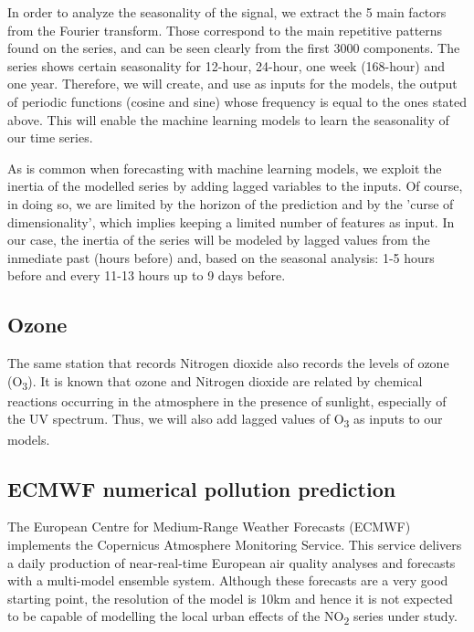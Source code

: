 \documentclass[a4paper,3p,sort&compress]{elsarticle}
\begin{document}
In order to analyze the seasonality of the signal, we extract the 5
main factors from the Fourier transform. Those correspond to the main
repetitive patterns found on the series, and can be seen clearly from
the first 3000 components. The series shows certain seasonality for
12-hour, 24-hour, one week (168-hour) and one year.  Therefore, we will
create, and use as inputs for the models, the output of periodic
functions (cosine and sine) whose frequency is equal to the ones
stated above. This will enable the machine learning models to learn
the seasonality of our time series.

As is common when forecasting with machine learning models, we exploit
the inertia of the modelled series by adding lagged variables to the
inputs. Of course, in doing so, we are limited by the horizon of the
prediction and by the 'curse of dimensionality', which implies keeping
a limited number of features as input. In our case, the inertia of the
series will be modeled by lagged values from the inmediate past (hours
before) and, based on the seasonal analysis: 1-5 hours before and
every 11-13 hours up to 9 days before.

\subsection{Ozone}


The same station that records Nitrogen dioxide also records the levels
of ozone (O\textsubscript{3}). It is known that ozone and Nitrogen
dioxide are related by chemical reactions occurring in the atmosphere
in the presence of sunlight, especially of the UV spectrum.  %
Thus, we will also add lagged values of O\textsubscript{3} as inputs
to our models.

\subsection{ECMWF numerical pollution prediction}
\label{sec:ecmwf-numer-poll}

The European Centre for Medium-Range Weather Forecasts (ECMWF)
implements the Copernicus Atmosphere Monitoring Service.  This service
delivers a daily production of near-real-time European air quality
analyses and forecasts with a multi-model ensemble system. Although
these forecasts are a very good starting point, 
the resolution of the model is 10km
and hence it is not expected to be capable of modelling the local
urban effects of the NO\textsubscript{2} series under study.
\end{document}
